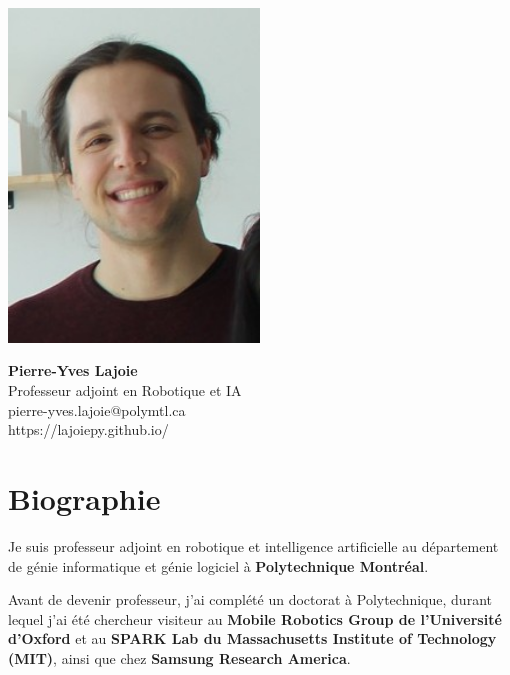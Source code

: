 \documentclass[a4paper,12pt]{article}
\begin{document}
\begin{minipage}{0.3\textwidth}
    \includegraphics[width=0.5\textwidth]{../images/profile.jpg} %
\end{minipage}
\begin{minipage}{0.65\textwidth}

    {\LARGE \textbf{Pierre-Yves Lajoie}
    \vspace{0.5em}}\\
    \vspace{0.5em}
    {\large Professeur adjoint en Robotique et IA}\\
    \vspace{0.2em}
    \vspace{0.2em}
    pierre-yves.lajoie@polymtl.ca\\
    \vspace{0.5em}
    https://lajoiepy.github.io/\\
\end{minipage}
\vspace{1em}

\section{Biographie}
Je suis professeur adjoint en robotique et intelligence artificielle au département de génie informatique et génie logiciel à \textbf{Polytechnique Montréal}. 

Avant de devenir professeur, j'ai complété un doctorat à Polytechnique, durant lequel j'ai été chercheur visiteur au \textbf{Mobile Robotics Group de l'Université d'Oxford} et au \textbf{SPARK Lab du Massachusetts Institute of Technology (MIT)}, ainsi que chez \textbf{Samsung Research America}.
\end{document}
